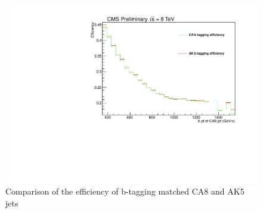 \begin{figure}[Htcb]
\centering
\includegraphics[width=1.0\textwidth]{figs/beffCAptr32700.pdf}
\caption{Comparison of the efficiency of b-tagging matched CA8 and AK5 jets}
\label{figs:beff}
\end{figure}






